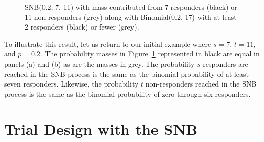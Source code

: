\documentclass[sii]{ipart}
\begin{document}
\begin{figure}
\centering
{}
\hfill
{}
\caption{
SNB(0.2, 7, 11) with mass contributed from 
7 responders (black) or 11 non-responders (grey) along with 
Binomial(0.2, 17) with at least 2 responders (black) or fewer (grey).
}
\label{fig:snb_bin_compare}
\end{figure}

To illustrate this result, let us return to our initial example
where $s=7$, $t=11$, and $p=0.2$.  The probability masses in
Figure~\ref{fig:snb_bin_compare} represented in 
black are equal in panels (a) and (b) as are the masses in grey.
The probability $s$
responders are reached in the SNB process is the same as the binomial 
probability of at least seven responders. Likewise, the probability $t$ 
non-responders reached in the SNB process is the same as the binomial
probability of zero through six responders.

\section{Trial Design with the SNB}
\end{document}
